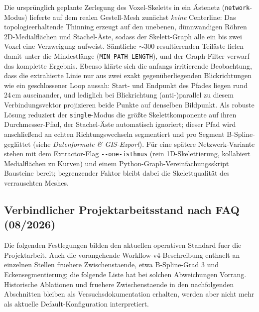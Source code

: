 \documentclass[12pt,a4paper]{article}
\begin{document}
\begin{enumerate}
          Die ursprünglich geplante Zerlegung des Voxel-Skeletts in ein Ästenetz (\texttt{network}-Modus) lieferte auf dem realen Gestell-Mesh zunächst \emph{keine} Centerline: Das topologieerhaltende Thinning erzeugt auf den unebenen, dünnwandigen Röhren 2D-Medialflächen und Stachel-Äste, sodass der Skelett-Graph alle ein bis zwei Voxel eine Verzweigung aufweist. Sämtliche $\sim$300 resultierenden Teiläste fielen damit unter die Mindestlänge (\texttt{MIN\_PATH\_LENGTH}), und der Graph-Filter verwarf das komplette Ergebnis. Ebenso klärte sich die anfangs irritierende Beobachtung, dass die extrahierte Linie nur aus zwei exakt gegenüberliegenden Blickrichtungen wie ein geschlossener Loop aussah: Start- und Endpunkt des Pfades liegen rund 24\,cm auseinander, und lediglich bei Blickrichtung (anti-)parallel zu diesem Verbindungsvektor projizieren beide Punkte auf denselben Bildpunkt. Als robuste Lösung reduziert der \texttt{single}-Modus die größte Skelettkomponente auf ihren Durchmesser-Pfad, der Stachel-Äste automatisch ignoriert; dieser Pfad wird anschließend an echten Richtungswechseln segmentiert und pro Segment B-Spline-geglättet (siehe \textit{Datenformate \& GIS-Export}). Für eine spätere Netzwerk-Variante stehen mit dem Extractor-Flag \texttt{-{}-one-isthmus} (rein 1D-Skelettierung, kollabiert Medialflächen zu Kurven) und einem Python-Graph-Vereinfachungsskript Bausteine bereit; begrenzender Faktor bleibt dabei die Skelettqualität des verrauschten Meshes.
\end{enumerate}

\subsection*{Verbindlicher Projektarbeitsstand nach FAQ (08/2026)}
Die folgenden Festlegungen bilden den aktuellen operativen Standard fuer die
Projektarbeit. Auch die vorangehende Workflow-v4-Beschreibung enthaelt an
einzelnen Stellen fruehere Zwischenstaende, etwa B-Spline-Grad 3 und
Eckensegmentierung; die folgende Liste hat bei solchen Abweichungen Vorrang.
Historische Ablationen und fruehere Zwischenstaende in den nachfolgenden
Abschnitten bleiben als Versuchsdokumentation erhalten, werden aber nicht mehr
als aktuelle Default-Konfiguration interpretiert.
\end{document}
